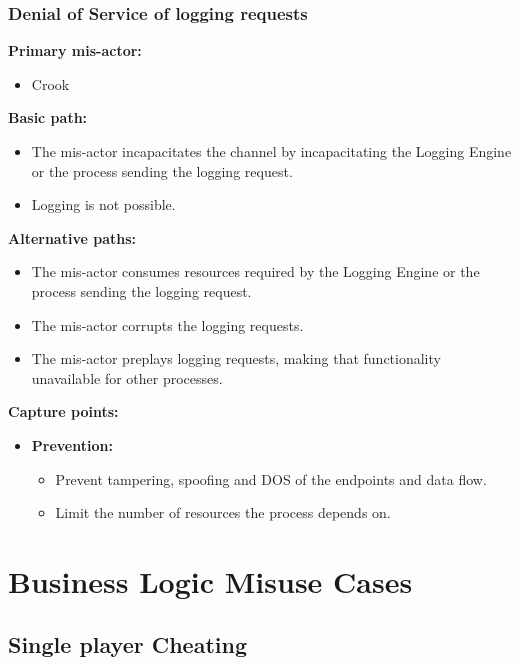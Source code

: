 \documentclass[a4paper,11pt]{report}
\begin{document}
\subsubsection{Denial of Service of logging requests}
\label{LoggingEngineFlowCasesD}
\textbf{Primary mis-actor:}
\begin{itemize}
\item Crook
\end{itemize}
\textbf{Basic path:}
\begin{itemize}
\item The mis-actor incapacitates the channel by incapacitating the Logging Engine or the process sending the logging request.
\item Logging is not possible.
\end{itemize}
\textbf{Alternative paths:}
\begin{itemize}
\item The mis-actor consumes resources required by the Logging Engine or the process sending the logging request.
\item The mis-actor corrupts the logging requests.
\item The mis-actor preplays logging requests, making that functionality unavailable for other processes.
\end{itemize}
\textbf{Capture points:}
\begin{itemize}
\item \textbf{Prevention:}
\begin{itemize}
\item Prevent tampering, spoofing and DOS of the endpoints and data flow.
\item Limit the number of resources the process depends on.
\end{itemize}
\end{itemize}

\section{Business Logic Misuse Cases}

\subsection{Single player Cheating}
\end{document}
